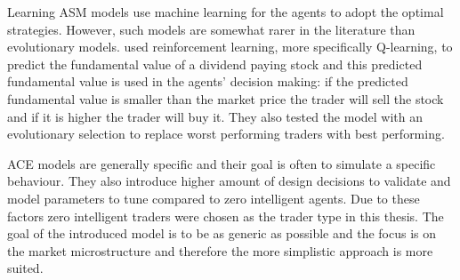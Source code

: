 Learning ASM models use machine learning for the agents to adopt the optimal strategies.
However, such models are somewhat rarer in the literature than evolutionary
models. \citet{Reinforcement09} used reinforcement 
learning, more specifically Q-learning, to predict the fundamental value of a 
dividend paying stock and this predicted fundamental value is used in the agents' 
decision making: if the predicted fundamental value is smaller than the market price
the trader will sell the stock and if it is higher the trader will buy it. They 
also tested the model with an evolutionary selection to replace worst performing
traders with best performing.





ACE models are generally specific and their goal is often to simulate a specific behaviour.
They also introduce higher amount of design decisions to validate and model parameters 
to tune compared to zero intelligent agents. Due to these factors zero intelligent traders
were chosen as the trader type in this thesis. The goal of the introduced model is to be as 
generic as possible and the focus is on the market microstructure and therefore the more 
simplistic approach is more suited.